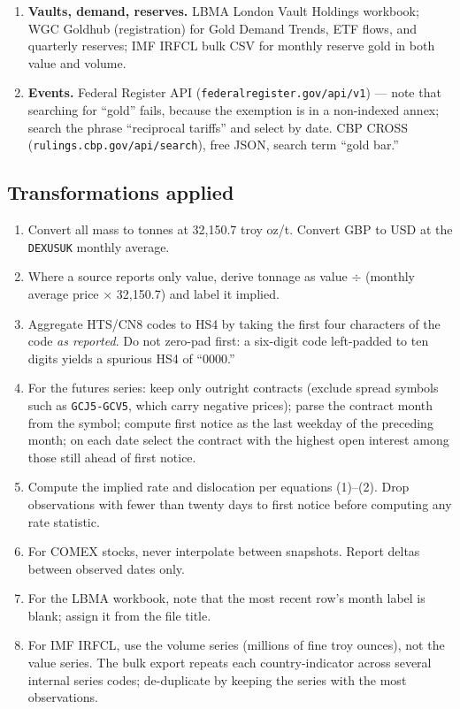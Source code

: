 \documentclass[11pt,a4paper]{article}
\begin{document}
\begin{enumerate}[leftmargin=*]
\item \textbf{Vaults, demand, reserves.} LBMA London Vault Holdings workbook; WGC Goldhub
(registration) for Gold Demand Trends, ETF flows, and quarterly reserves; IMF IRFCL bulk CSV
for monthly reserve gold in both value and volume.

\item \textbf{Events.} Federal Register API (\texttt{federalregister.gov/api/v1}) --- note that
searching for ``gold'' fails, because the exemption is in a non-indexed annex; search the phrase
``reciprocal tariffs'' and select by date. CBP CROSS (\texttt{rulings.cbp.gov/api/search}),
free JSON, search term ``gold bar.''
\end{enumerate}

\subsection{Transformations applied}

\begin{enumerate}[leftmargin=*]
\item Convert all mass to tonnes at 32{,}150.7 troy oz/t. Convert GBP to USD at the
\texttt{DEXUSUK} monthly average.
\item Where a source reports only value, derive tonnage as value $\div$ (monthly average price
$\times$ 32{,}150.7) and label it implied.
\item Aggregate HTS/CN8 codes to HS4 by taking the first four characters of the code
\emph{as reported}. Do not zero-pad first: a six-digit code left-padded to ten digits yields a
spurious HS4 of ``0000.''
\item For the futures series: keep only outright contracts (exclude spread symbols such as
\texttt{GCJ5-GCV5}, which carry negative prices); parse the contract month from the symbol;
compute first notice as the last weekday of the preceding month; on each date select the
contract with the highest open interest among those still ahead of first notice.
\item Compute the implied rate and dislocation per equations (1)--(2). Drop observations with
fewer than twenty days to first notice before computing any rate statistic.
\item For COMEX stocks, never interpolate between snapshots. Report deltas between observed
dates only.
\item For the LBMA workbook, note that the most recent row's month label is blank; assign it
from the file title.
\item For IMF IRFCL, use the volume series (millions of fine troy ounces), not the value
series. The bulk export repeats each country-indicator across several internal series codes;
de-duplicate by keeping the series with the most observations.
\end{enumerate}
\end{document}
